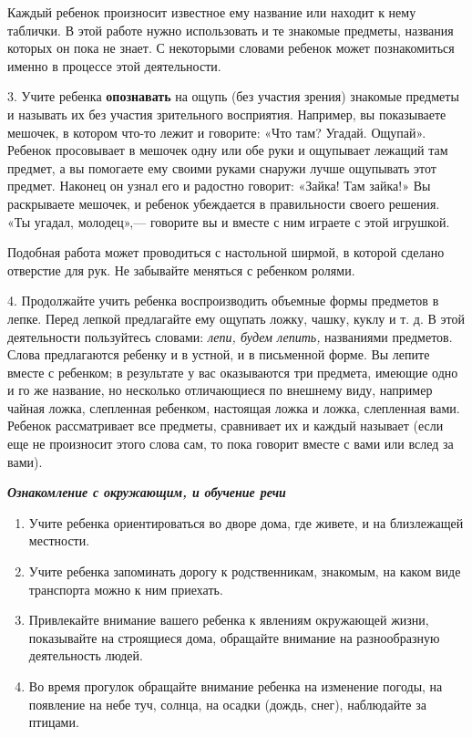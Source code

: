 \documentclass{book}
\renewcommand{\emph}[1]{\textit{#1}}
\begin{document}
Каждый ребенок произносит известное ему название или находит к нему
таблички. В этой работе нужно использовать и те знакомые предметы,
названия которых он пока не знает. С некоторыми словами ребенок может
познакомиться именно в процессе этой деятельности.

3. Учите ребенка \textbf{опознавать} на ощупь (без участия зрения)
знакомые предметы и называть их без участия зрительного восприятия.
Например, вы показываете мешочек, в котором что-то лежит и говорите:
«Что там? Угадай. Ощупай». Ребенок просовывает в мешочек одну или обе
руки и ощупывает лежащий там предмет, а вы помогаете ему своими руками
снаружи лучше ощупывать этот предмет. Наконец он узнал его и радостно
говорит: «Зайка! Там зайка!» Вы раскрываете мешочек, и ребенок
убеждается в правильности своего решения. «Ты угадал, молодец»,---
говорите вы и вместе с ним играете с этой игрушкой.

Подобная работа может проводиться с настольной ширмой, в которой сделано
отверстие для рук. Не забывайте меняться с ребенком ролями.

4. Продолжайте учить ребенка воспроизводить объемные формы предметов в
лепке. Перед лепкой предлагайте ему ощупать ложку, чашку, куклу и т. д.
В этой деятельности пользуйтесь словами: \emph{лепи, будем лепить,}
названиями предметов. Слова предлагаются ребенку и в устной, и в
письменной форме. Вы лепите вместе с ребенком; в результате у вас
оказываются три предмета, имеющие одно и го же название, но несколько
отличающиеся по внешнему виду, например чайная ложка, слепленная
ребенком, настоящая ложка и ложка, слепленная вами. Ребенок
рассматривает все предметы, сравнивает их и каждый называет (если еще не
произносит этого слова сам, то пока говорит вместе с вами или вслед за
вами).

\emph{\textbf{Ознакомление с окружающим, и обучение речи}}


\begin{enumerate}
\def\labelenumi{\arabic{enumi}.}
\item
  
  Учите ребенка ориентироваться во дворе дома, где живете, и на
  близлежащей местности.
  
\item
  
  Учите ребенка запоминать дорогу к родственникам, знакомым, на каком
  виде транспорта можно к ним приехать.
  
\item
  
  Привлекайте внимание вашего ребенка к явлениям окружающей жизни,
  показывайте на строящиеся дома, обращайте внимание на разнообразную
  деятельность людей.
  
\item
  
  Во время прогулок обращайте внимание ребенка на изменение погоды, на
  появление на небе туч, солнца, на осадки (дождь, снег), наблюдайте за
  птицами.
  
\end{enumerate}
\end{document}
